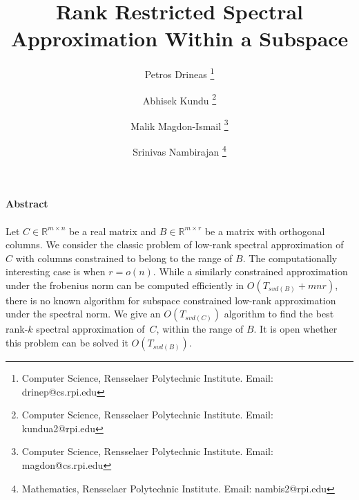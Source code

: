 \documentclass[11pt]{article}
\title{Rank Restricted Spectral Approximation  Within a Subspace \\ }
\author {Petros Drineas \footnote{Computer Science, Rensselaer Polytechnic Institute. Email: drinep@cs.rpi.edu} \\
\and
Abhisek Kundu \footnote{Computer Science, Rensselaer Polytechnic Institute. Email: kundua2@rpi.edu} \\
\and
Malik Magdon-Ismail \footnote{Computer Science, Rensselaer Polytechnic Institute. Email: magdon@cs.rpi.edu} \\
\and
Srinivas Nambirajan \footnote{Mathematics, Rensselaer Polytechnic Institute. Email: nambis2@rpi.edu} \\
\date{}
}
\def\reals{\mathbb{R}}
\begin{document}
         
\maketitle
\noindent \textbf{\small Abstract}
\\
\\ 
Let $C \in \reals^{m \times n}$ be a real matrix and $B \in \reals^{m \times r}$ be a matrix with orthogonal columns.
We consider the classic problem of low-rank spectral approximation of $C$ with columns constrained to belong to the range of $B$. The computationally interesting case is when $r = o(n)$. While a similarly constrained approximation under the frobenius norm can be computed efficiently in $O(T_{svd(B)}+ mnr)$, there is no known algorithm for subspace constrained low-rank approximation under the spectral norm. We give an $O(T_{svd(C)})$ algorithm to find the best rank-$k$ spectral approximation of~$C$, within the range of $B$. It is open whether this problem can be solved it $O(T_{svd(B)})$.
\end{document}
